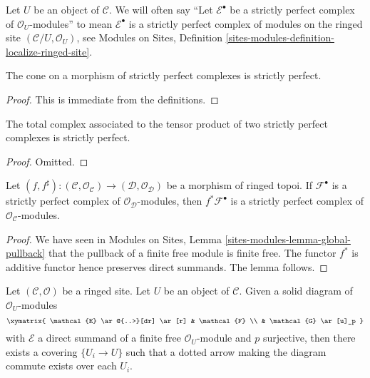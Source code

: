 \noindent
Let $U$ be an object of $\mathcal{C}$. We will often say
``Let $\mathcal{E}^\bullet$ be a strictly perfect complex of
$\mathcal{O}_U$-modules'' to mean $\mathcal{E}^\bullet$ is a strictly perfect
complex of modules on the ringed site $(\mathcal{C}/U, \mathcal{O}_U)$, see
Modules on Sites, Definition
\ref{sites-modules-definition-localize-ringed-site}.

\begin{lemma}
\label{lemma-cone}
The cone on a morphism of strictly perfect complexes is
strictly perfect.
\end{lemma}

\begin{proof}
This is immediate from the definitions.
\end{proof}

\begin{lemma}
\label{lemma-tensor}
The total complex associated to the tensor product of two
strictly perfect complexes is strictly perfect.
\end{lemma}

\begin{proof}
Omitted.
\end{proof}

\begin{lemma}
\label{lemma-strictly-perfect-pullback}
Let $(f, f^\sharp) : (\mathcal{C}, \mathcal{O}_\mathcal{C}) \to
(\mathcal{D}, \mathcal{O}_\mathcal{D})$
be a morphism of ringed topoi. If $\mathcal{F}^\bullet$ is a strictly
perfect complex of $\mathcal{O}_\mathcal{D}$-modules, then
$f^*\mathcal{F}^\bullet$ is a strictly perfect complex of
$\mathcal{O}_\mathcal{C}$-modules.
\end{lemma}

\begin{proof}
We have seen in
Modules on Sites, Lemma \ref{sites-modules-lemma-global-pullback}
that the pullback of a finite free module is finite free. The functor
$f^*$ is additive functor hence preserves direct summands. The lemma follows.
\end{proof}

\begin{lemma}
\label{lemma-local-lift-map}
Let $(\mathcal{C}, \mathcal{O})$ be a ringed site. Let $U$ be an object of
$\mathcal{C}$. Given a solid diagram of $\mathcal{O}_U$-modules
$$
\xymatrix{
\mathcal{E} \ar@{..>}[dr] \ar[r] & \mathcal{F} \\
& \mathcal{G} \ar[u]_p
}
$$
with $\mathcal{E}$ a direct summand of a finite free
$\mathcal{O}_U$-module and $p$ surjective, then there exists a
covering $\{U_i \to U\}$ such that a dotted arrow
making the diagram commute exists over each $U_i$.
\end{lemma}

